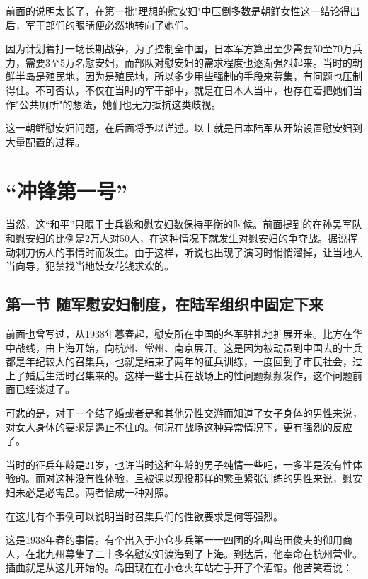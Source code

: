 \documentclass[12pt,UTF8]{ctexbook}
\begin{document}
前面的说明太长了，在第一批"理想的慰安妇"中压倒多数是朝鲜女性这一结论得出后，军干部们的眼睛便必然地转向了她们。



因为计划着打一场长期战争，为了控制全中国，日本军方算出至少需要50至70万兵力，需要3至5万名慰安妇，而部队对慰安妇的需求程度也逐渐强烈起来。当时的朝鲜半岛是殖民地，因为是殖民地，所以多少用些强制的手段来募集，有问题也压制得住。不可否认，不仅在当时的军干部中，就是在日本人当中，也存在着把她们当作"公共厕所"的想法，她们也无力抵抗这类歧视。



这一朝鲜慰安妇问题，在后面将予以详述。以上就是日本陆军从开始设置慰安妇到大量配置的过程。


\chapter{“冲锋第一号”}

当然，这“和平”只限于士兵数和慰安妇数保持平衡的时候。前面提到的在孙吴军队和慰安妇的比例是2万人对50人，在这种情况下就发生对慰安妇的争夺战。据说挥动刺刀伤人的事情时而发生。由于这样，听说也出现了演习时悄悄溜掉，让当地人当向导，犯禁找当地妓女花钱求欢的。

\section{第一节 随军慰安妇制度，在陆军组织中固定下来}



前面也曾写过，从1938年暮春起，慰安所在中国的各军驻扎地扩展开来。比方在华中战线，由上海开始，向杭州、常州、南京展开。这是因为被动员到中国去的士兵都是年纪较大的召集兵，也就是结束了两年的征兵训练，一度回到了市民社会，过上了婚后生活时召集来的。这样一些士兵在战场上的性问题频频发作，这个问题前面已经谈过了。



可悲的是，对于一个结了婚或者是和其他异性交游而知道了女子身体的男性来说，对女人身体的要求是遏止不住的。何况在战场这种异常情况下，更有强烈的反应了。



当时的征兵年龄是21岁，也许当时这种年龄的男子纯情一些吧，一多半是没有性体验的。而对这种没有性体验，且被课以现役那样的繁重紧张训练的男性来说，慰安妇未必是必需品。两者恰成一种对照。



在这儿有个事例可以说明当时召集兵们的性欲要求是何等强烈。



这是1938年春的事情。有个出入于小仓步兵第一一四团的名叫岛田俊夫的御用商人，在北九州募集了二十多名慰安妇渡海到了上海。到达后，他奉命在杭州营业。插曲就是从这儿开始的。岛田现在在小仓火车站右手开了个酒馆。他苦笑着说：
\end{document}
